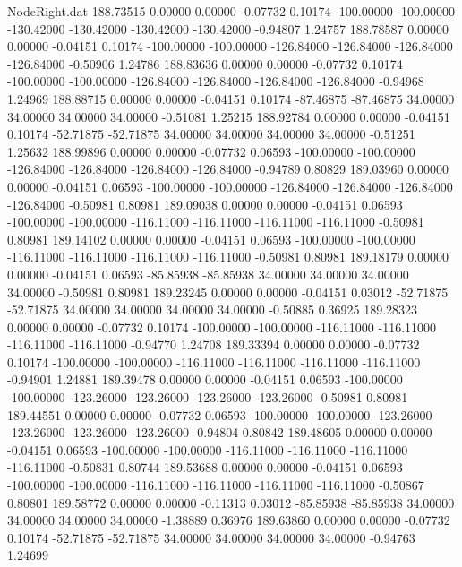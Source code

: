 \begin{filecontents}{NodeRight.dat}
 188.73515    0.00000    0.00000    -0.07732    0.10174 -100.00000 -100.00000 -130.42000 -130.42000 -130.42000 -130.42000   -0.94807    1.24757
 188.78587    0.00000    0.00000    -0.04151    0.10174 -100.00000 -100.00000 -126.84000 -126.84000 -126.84000 -126.84000   -0.50906    1.24786
 188.83636    0.00000    0.00000    -0.07732    0.10174 -100.00000 -100.00000 -126.84000 -126.84000 -126.84000 -126.84000   -0.94968    1.24969
 188.88715    0.00000    0.00000    -0.04151    0.10174  -87.46875  -87.46875   34.00000   34.00000   34.00000   34.00000   -0.51081    1.25215
 188.92784    0.00000    0.00000    -0.04151    0.10174  -52.71875  -52.71875   34.00000   34.00000   34.00000   34.00000   -0.51251    1.25632
 188.99896    0.00000    0.00000    -0.07732    0.06593 -100.00000 -100.00000 -126.84000 -126.84000 -126.84000 -126.84000   -0.94789    0.80829
 189.03960    0.00000    0.00000    -0.04151    0.06593 -100.00000 -100.00000 -126.84000 -126.84000 -126.84000 -126.84000   -0.50981    0.80981
 189.09038    0.00000    0.00000    -0.04151    0.06593 -100.00000 -100.00000 -116.11000 -116.11000 -116.11000 -116.11000   -0.50981    0.80981
 189.14102    0.00000    0.00000    -0.04151    0.06593 -100.00000 -100.00000 -116.11000 -116.11000 -116.11000 -116.11000   -0.50981    0.80981
 189.18179    0.00000    0.00000    -0.04151    0.06593  -85.85938  -85.85938   34.00000   34.00000   34.00000   34.00000   -0.50981    0.80981
 189.23245    0.00000    0.00000    -0.04151    0.03012  -52.71875  -52.71875   34.00000   34.00000   34.00000   34.00000   -0.50885    0.36925
 189.28323    0.00000    0.00000    -0.07732    0.10174 -100.00000 -100.00000 -116.11000 -116.11000 -116.11000 -116.11000   -0.94770    1.24708
 189.33394    0.00000    0.00000    -0.07732    0.10174 -100.00000 -100.00000 -116.11000 -116.11000 -116.11000 -116.11000   -0.94901    1.24881
 189.39478    0.00000    0.00000    -0.04151    0.06593 -100.00000 -100.00000 -123.26000 -123.26000 -123.26000 -123.26000   -0.50981    0.80981
 189.44551    0.00000    0.00000    -0.07732    0.06593 -100.00000 -100.00000 -123.26000 -123.26000 -123.26000 -123.26000   -0.94804    0.80842
 189.48605    0.00000    0.00000    -0.04151    0.06593 -100.00000 -100.00000 -116.11000 -116.11000 -116.11000 -116.11000   -0.50831    0.80744
 189.53688    0.00000    0.00000    -0.04151    0.06593 -100.00000 -100.00000 -116.11000 -116.11000 -116.11000 -116.11000   -0.50867    0.80801
 189.58772    0.00000    0.00000    -0.11313    0.03012  -85.85938  -85.85938   34.00000   34.00000   34.00000   34.00000   -1.38889    0.36976
 189.63860    0.00000    0.00000    -0.07732    0.10174  -52.71875  -52.71875   34.00000   34.00000   34.00000   34.00000   -0.94763    1.24699

\end{filecontents}
